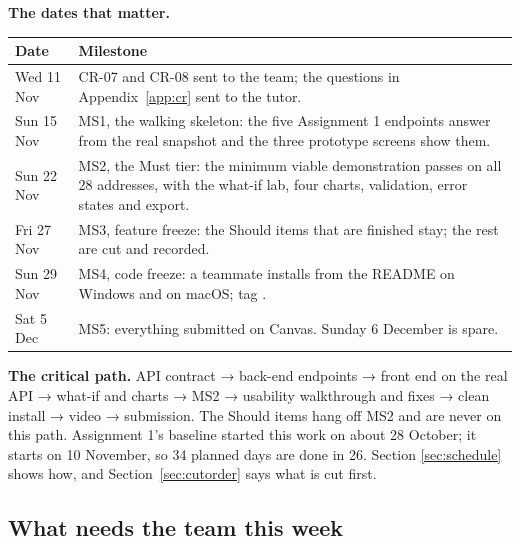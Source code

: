 \textbf{The dates that matter.}
\begin{center}
\small
\begin{tabularx}{\textwidth}{@{}L{3.2cm}Y@{}}
\toprule
\textbf{Date} & \textbf{Milestone} \\
\midrule
Wed 11 Nov & CR-07 and CR-08 sent to the team; the questions in Appendix~\ref{app:cr} sent to the tutor. \\
Sun 15 Nov & MS1, the walking skeleton: the five Assignment 1 endpoints answer from the real snapshot and the three prototype screens show them. \\
Sun 22 Nov & MS2, the Must tier: the minimum viable demonstration passes on all 28 addresses, with the what-if lab, four charts, validation, error states and export. \\
Fri 27 Nov & MS3, feature freeze: the Should items that are finished stay; the rest are cut and recorded. \\
Sun 29 Nov & MS4, code freeze: a teammate installs from the README on Windows and on macOS; tag . \\
Sat 5 Dec & MS5: everything submitted on Canvas. Sunday 6 December is spare. \\
\bottomrule
\end{tabularx}
\end{center}

\textbf{The critical path.} API contract → back-end endpoints → front end on the real API →
what-if and charts → MS2 → usability walkthrough and fixes → clean install → video → submission.
The Should items hang off MS2 and are never on this path. Assignment 1's baseline started this work
on about 28 October; it starts on 10 November, so 34 planned days are done in 26. Section
\ref{sec:schedule} shows how, and Section~\ref{sec:cutorder} says what is cut first.

\subsection{What needs the team this week}
\label{sec:needsteam}

